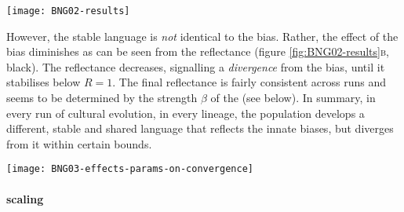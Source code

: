 \documentclass{../src/bcthesispart}
\begin{document}
\begin{SCfigure}
	\texttt{[image: BNG02-results]}
	
	\caption{%
	The Dirichlet-categorical name converges to a stable, coherent language.
	 The distance between expected languages vanishes, but the aggregate language deviates from the bias. 
	 Coherence initially drops, but then increases to 1. The black line illustrates the \emph{reflection of the bias}.
	\label{fig:BNG02-results}}
\end{SCfigure}




However, the stable language is \emph{not} identical to the bias. 
Rather, the effect of the bias diminishes as can be seen from the reflectance (figure \ref{fig:BNG02-results}\textsc{b}, black).
The reflectance decreases, signalling a \emph{divergence} from the bias, until it stabilises below $R=1$.
The final reflectance is fairly consistent across runs and seems to be determined by the strength $\beta$ of the    (see below).
In summary, in every run of cultural evolution, in every lineage, the population develops a different, stable and shared language that reflects the innate biases, but diverges from it within certain bounds.



\begin{SCfigure}
	\texttt{[image: BNG03-effects-params-on-convergence]}
	\caption{Effects of the language, population and bottleneck size on convergence time, probed by the critical points $t_{\text{max}}$ and $t_{\text{int}}$. See main text for details.
		\label{fig:BNG03-effects-params-on-convergence}}
\end{SCfigure}




\paragraph{scaling}
\end{document}

